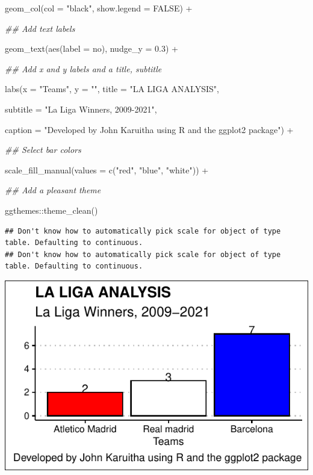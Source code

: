 \documentclass[]{tufte-handout}
\newenvironment{Shaded}{}{}
\newcommand{\AttributeTok}[1]{\textcolor[rgb]{0.49,0.56,0.16}{#1}}
\newcommand{\ConstantTok}[1]{\textcolor[rgb]{0.53,0.00,0.00}{#1}}
\newcommand{\DocumentationTok}[1]{\textcolor[rgb]{0.73,0.13,0.13}{\textit{#1}}}
\newcommand{\FloatTok}[1]{\textcolor[rgb]{0.25,0.63,0.44}{#1}}
\newcommand{\FunctionTok}[1]{\textcolor[rgb]{0.02,0.16,0.49}{#1}}
\newcommand{\NormalTok}[1]{#1}
\newcommand{\SpecialCharTok}[1]{\textcolor[rgb]{0.25,0.44,0.63}{#1}}
\newcommand{\StringTok}[1]{\textcolor[rgb]{0.25,0.44,0.63}{#1}}
\begin{document}
\begin{Shaded}
\begin{Highlighting}[]
        \FunctionTok{geom\_col}\NormalTok{(}\AttributeTok{col =} \StringTok{"black"}\NormalTok{, }\AttributeTok{show.legend =} \ConstantTok{FALSE}\NormalTok{) }\SpecialCharTok{+} 
        
        \DocumentationTok{\#\# Add text labels}
        
        \FunctionTok{geom\_text}\NormalTok{(}\FunctionTok{aes}\NormalTok{(}\AttributeTok{label =}\NormalTok{ no), }\AttributeTok{nudge\_y =} \FloatTok{0.3}\NormalTok{) }\SpecialCharTok{+}
        
        \DocumentationTok{\#\# Add x and y labels and a title, subtitle}
        
        \FunctionTok{labs}\NormalTok{(}\AttributeTok{x =} \StringTok{"Teams"}\NormalTok{, }\AttributeTok{y =} \StringTok{""}\NormalTok{, }\AttributeTok{title =} \StringTok{"LA LIGA ANALYSIS"}\NormalTok{, }
             
             \AttributeTok{subtitle =} \StringTok{"La Liga Winners, 2009{-}2021"}\NormalTok{, }
             
             \AttributeTok{caption =} \StringTok{"Developed by John Karuitha using R and the ggplot2 package"}\NormalTok{) }\SpecialCharTok{+} 
        
        \DocumentationTok{\#\# Select bar colors}
        
        \FunctionTok{scale\_fill\_manual}\NormalTok{(}\AttributeTok{values =} \FunctionTok{c}\NormalTok{(}\StringTok{"red"}\NormalTok{, }\StringTok{"blue"}\NormalTok{, }\StringTok{"white"}\NormalTok{)) }\SpecialCharTok{+} 
        
        \DocumentationTok{\#\# Add a pleasant theme}
        
\NormalTok{        ggthemes}\SpecialCharTok{::}\FunctionTok{theme\_clean}\NormalTok{()}
\end{Highlighting}
\end{Shaded}

\begin{verbatim}
## Don't know how to automatically pick scale for object of type table. Defaulting to continuous.
## Don't know how to automatically pick scale for object of type table. Defaulting to continuous.
\end{verbatim}

\includegraphics{web_scrapping_la_liga_files/figure-latex/graph_top_teams_2009_20-1}
\end{document}
